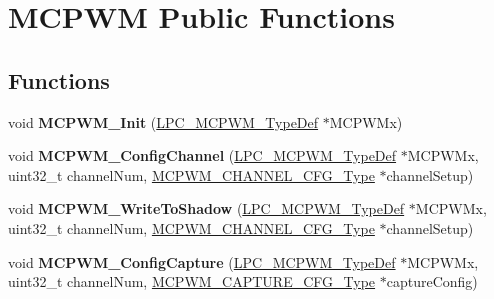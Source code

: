 \hypertarget{group___m_c_p_w_m___public___functions}{\section{\-M\-C\-P\-W\-M \-Public \-Functions}
\label{group___m_c_p_w_m___public___functions}
}
\subsection*{\-Functions}
\begin{DoxyCompactItemize}
\item 
\hypertarget{group___m_c_p_w_m___public___functions_gadf65fddc09f33f44ce17da0feccd4ea5}{void {\bfseries \-M\-C\-P\-W\-M\-\_\-\-Init} (\hyperlink{struct_l_p_c___m_c_p_w_m___type_def}{\-L\-P\-C\-\_\-\-M\-C\-P\-W\-M\-\_\-\-Type\-Def} $\ast$\-M\-C\-P\-W\-Mx)}\label{group___m_c_p_w_m___public___functions_gadf65fddc09f33f44ce17da0feccd4ea5}

\item 
\hypertarget{group___m_c_p_w_m___public___functions_ga21e00385fd06b6603cc8d865fa844277}{void {\bfseries \-M\-C\-P\-W\-M\-\_\-\-Config\-Channel} (\hyperlink{struct_l_p_c___m_c_p_w_m___type_def}{\-L\-P\-C\-\_\-\-M\-C\-P\-W\-M\-\_\-\-Type\-Def} $\ast$\-M\-C\-P\-W\-Mx, uint32\-\_\-t channel\-Num, \hyperlink{struct_m_c_p_w_m___c_h_a_n_n_e_l___c_f_g___type}{\-M\-C\-P\-W\-M\-\_\-\-C\-H\-A\-N\-N\-E\-L\-\_\-\-C\-F\-G\-\_\-\-Type} $\ast$channel\-Setup)}\label{group___m_c_p_w_m___public___functions_ga21e00385fd06b6603cc8d865fa844277}

\item 
\hypertarget{group___m_c_p_w_m___public___functions_gad6e86195fdc0f79320e8e001fb2bfbab}{void {\bfseries \-M\-C\-P\-W\-M\-\_\-\-Write\-To\-Shadow} (\hyperlink{struct_l_p_c___m_c_p_w_m___type_def}{\-L\-P\-C\-\_\-\-M\-C\-P\-W\-M\-\_\-\-Type\-Def} $\ast$\-M\-C\-P\-W\-Mx, uint32\-\_\-t channel\-Num, \hyperlink{struct_m_c_p_w_m___c_h_a_n_n_e_l___c_f_g___type}{\-M\-C\-P\-W\-M\-\_\-\-C\-H\-A\-N\-N\-E\-L\-\_\-\-C\-F\-G\-\_\-\-Type} $\ast$channel\-Setup)}\label{group___m_c_p_w_m___public___functions_gad6e86195fdc0f79320e8e001fb2bfbab}

\item 
\hypertarget{group___m_c_p_w_m___public___functions_gaa0adc9dac370774b463dc71f4f326b62}{void {\bfseries \-M\-C\-P\-W\-M\-\_\-\-Config\-Capture} (\hyperlink{struct_l_p_c___m_c_p_w_m___type_def}{\-L\-P\-C\-\_\-\-M\-C\-P\-W\-M\-\_\-\-Type\-Def} $\ast$\-M\-C\-P\-W\-Mx, uint32\-\_\-t channel\-Num, \hyperlink{struct_m_c_p_w_m___c_a_p_t_u_r_e___c_f_g___type}{\-M\-C\-P\-W\-M\-\_\-\-C\-A\-P\-T\-U\-R\-E\-\_\-\-C\-F\-G\-\_\-\-Type} $\ast$capture\-Config)}\label{group___m_c_p_w_m___public___functions_gaa0adc9dac370774b463dc71f4f326b62}


\end{DoxyCompactItemize}
